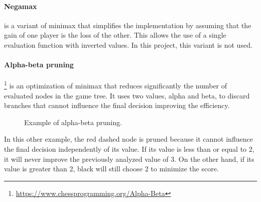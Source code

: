 \paragraph{Negamax} is a variant of minimax that simplifies the implementation by assuming that the gain of one player is the loss of the other. This allows the use of a single evaluation function with inverted values. In this project, this variant is not used.

\paragraph{Alpha-beta pruning}\footnote{\url{https://www.chessprogramming.org/Alpha-Beta}} is an optimization of minimax that reduces significantly the number of evaluated nodes in the game tree. It uses two values, alpha and beta, to discard branches that cannot influence the final decision improving the efficiency.

\begin{figure}[H]
    \centering
    \caption{Example of alpha-beta pruning.}
    \label{fig:alpha-beta-pruning}
\end{figure}

In this other example, the red dashed node is pruned because it cannot influence the final decision independently of its value. If its value is less than or equal to 2, it will never improve the previously analyzed value of 3. On the other hand, if its value is greater than 2, black will still choose 2 to minimize the score.

